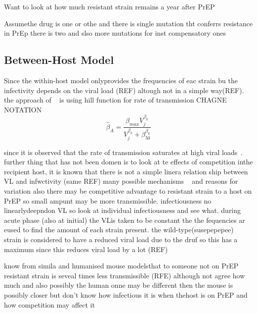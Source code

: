 \documentclass[DIV=15]{scrartcl}
\begin{document}
Want to look  at how much resistant strain remains a year after PrEP


\iffalse
pictures made on  26/05 max values occur at (for strain 1 initial) a=0.01, rL=2 in the active compartment

for the reservoir max occurs at a=1.25e-4 and rL=0.55

now for homeostatic proliferation  the max value in the reservoir is when rho = 0 (just great!) and rL=1.6

in the active compartment it  is rL=1.375 and rho=0.009
\fi


\fi



Assumethe drug is one or othe and there is single mutation tht conferrs resistance in PrEp there is two and slso more mutations for inst compensatory ones

\subsection{Between-Host Model}

Since the within-host model onlyprovides the frequencies of eac  strain bu the infectivity depends on the viral load (REF) altough not in a simple way(REF). the approach of ~\cite{shirreff2011}  is using hill function for rate of transmission 
CHAGNE NOTATION
\begin{equation}
\hat{\beta}_A = \frac{\beta_{max}V_j^{\beta_k}}{V_j^{\beta_k} + \beta_{50}^{\beta_k}}
\end{equation}

since it is observed that the rate of transmission saturates at high viral loads~\cite{fraser2007}.  further thing that has not been domen is to look at te effects of competition inthe recipient host, it is known that there is not a simple linera relation ship between VL and infwctivity (same REF) 
many possible mechanisms ~\cite{fraser2014,gupta2006,wagner2012,joseph2015} and reasons for variation also there may be competitive advantage to resistant strain to  a host on PrEP  so small ampunt may be more transmissible.
infectiousness no linearlydeepndon VL   so look at individual infectiousness and see what. during acute phase (also  at initial) the VLis taken to be constant the the fequencies ar eused to find the amount of each strain present. the wild-type(susepepepee)  strain is considered  to have a reduced viral load due to the druf so this has a maximum since this reduces viral load by a lot (REF)

know from simila and humanised mouse modelsthat to someone not on PrEP resistant strain is seveal times less transmissible (RFE) although not agree how much and also  possibly the human onne may be different then the mouse is possibly closer but don't know how infectious it is when thehost is on PrEP and how competition may affect it 
\end{document}
